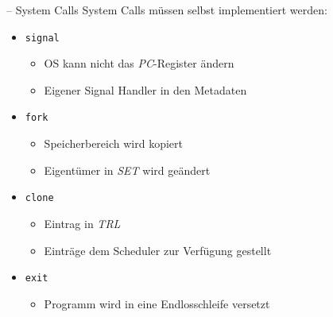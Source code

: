 \documentclass[fleqn,11pt,aspectratio=43,table]{beamer}
\begin{document}
\begin{frame}{\insertsectionhead -- System Calls}
	System Calls müssen selbst implementiert werden: \vfill
	\begin{itemize}
		\item \texttt{signal} \vfill
		\begin{itemize}
			\item OS kann nicht das \emph{PC}-Register ändern \vfill
			\item Eigener Signal Handler in den Metadaten \vfill
		\end{itemize}
		\item \texttt{fork} \vfill
		\begin{itemize}
			\item Speicherbereich wird kopiert \vfill
			\item Eigentümer in \emph{SET} wird geändert \vfill
		\end{itemize}
		\item \texttt{clone} \vfill
		\begin{itemize}
			\item Eintrag in \emph{TRL}  \vfill
			\item Einträge dem Scheduler zur Verfügung gestellt  \vfill
		\end{itemize}
		\item \texttt{exit}  \vfill
		\begin{itemize}
			\item Programm wird in eine Endlosschleife versetzt \vfill
		\end{itemize}
	\end{itemize}
\end{frame}
\end{document}
